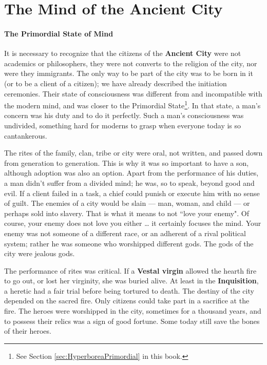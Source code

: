 \section{The Mind of the Ancient City}

\paragraph{The Primordial State of Mind}
It is necessary to recognize that the citizens of the \textbf{Ancient City} were not academics or philosophers, they were not converts to the religion of the city, nor were they immigrants. The only way to be part of the city was to be born in it (or to be a client of a citizen); we have already described the initiation ceremonies. Their state of consciousness was different from and incompatible with the modern mind, and was closer to the Primordial State\footnote{See Section \ref{sec:HyperboreaPrimordial} in this book.}. In that state, a man's concern was his duty and to do it perfectly. Such a man's consciousness was undivided, something hard for moderns to grasp when everyone today is so cantankerous.

The rites of the family, clan, tribe or city were oral, not written, and passed down from generation to generation. This is why it was so important to have a son, although adoption was also an option. Apart from the performance of his duties, a man didn't suffer from a divided mind; he was, so to speak, beyond good and evil. If a client failed in a task, a chief could punish or execute him with no sense of guilt. The enemies of a city would be slain — man, woman, and child — or perhaps sold into slavery. That is what it means to not ``love your enemy". Of course, your enemy does not love you either … it certainly focuses the mind. Your enemy was not someone of a different race, or an adherent of a rival political system; rather he was someone who worshipped different gods. The gods of the city were jealous gods.

The performance of rites was critical. If a \textbf{Vestal virgin} allowed the hearth fire to go out, or lost her virginity, she was buried alive. At least in the \textbf{Inquisition}, a heretic had a fair trial before being tortured to death. The destiny of the city depended on the sacred fire. Only citizens could take part in a sacrifice at the fire. The heroes were worshipped in the city, sometimes for a thousand years, and to possess their relics was a sign of good fortune. Some today still save the bones of their heroes.

